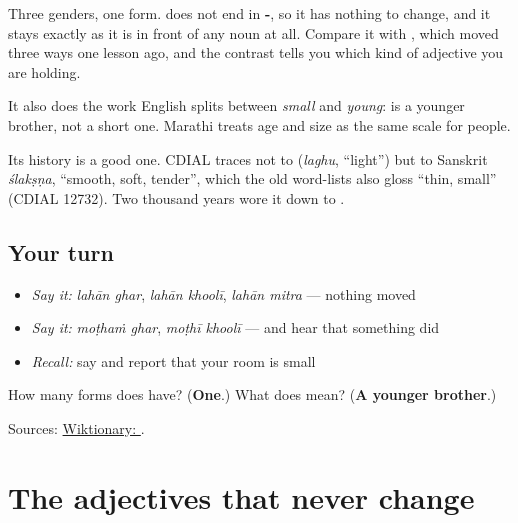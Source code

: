Three genders, one form. \textbf{} does not end in \textbf{-}, so it has nothing to change, and it stays exactly as it is in front of any noun at all. Compare it with \textbf{}, which moved three ways one lesson ago, and the contrast tells you which kind of adjective you are holding.

It also does the work English splits between \emph{small} and \emph{young}: \textbf{ } is a younger brother, not a short one. Marathi treats age and size as the same scale for people.

Its history is a good one. CDIAL traces \textbf{} not to \textbf{} (\emph{laghu}, \textquotedblleft{}light\textquotedblright{}) but to Sanskrit \emph{ślakṣṇa}, \textquotedblleft{}smooth, soft, tender\textquotedblright{}, which the old word-lists also gloss \textquotedblleft{}thin, small\textquotedblright{} (CDIAL 12732). Two thousand years wore it down to \textbf{}.

\subsection*{Your turn}
\begin{itemize}
\raggedright
  \item \emph{Say it:} \emph{lahān ghar}, \emph{lahān khoolī}, \emph{lahān mitra} — nothing moved
  \item \emph{Say it:} \emph{moṭhaṁ ghar}, \emph{moṭhī khoolī} — and hear that something did
  \item \emph{Recall:} say \textbf{} and report that your room is small
\end{itemize}

\begin{tcolorbox}[breakable,colback=teal!4,colframe=teal!35!black,title={Before you move on}]
How many forms does \textbf{} have? (\textbf{One}.) What does \textbf{ } mean? (\textbf{A younger brother}.)

Sources: \href{https://en.wiktionary.org/wiki/\%E0\%A4\%B2\%E0\%A4\%B9\%E0\%A4\%BE\%E0\%A4\%A8}{Wiktionary: }.
\end{tcolorbox}
\section[\texorpdfstring{\mr{लहान} · \mr{लहान} · \mr{लहान} (lahān · lahān …)}{लहान · लहान · लहान (lahān · lahān …)}]{The adjectives that never change}

